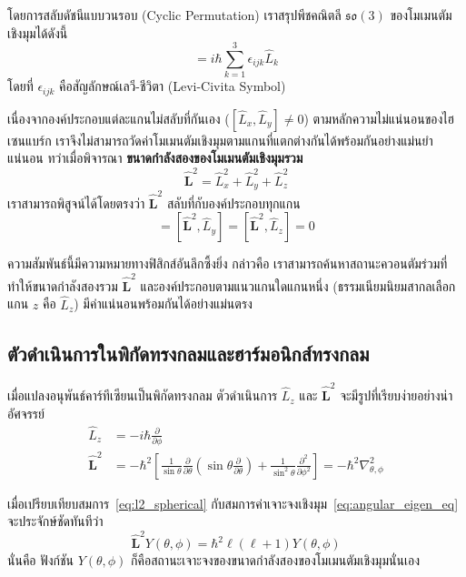 โดยการสลับดัชนีแบบวนรอบ (Cyclic Permutation) เราสรุปพีชคณิตลี $\mathfrak{so}(3)$ ของโมเมนตัมเชิงมุมได้ดังนี้
\begin{equation}
[\hat{L}_i, \hat{L}_j] = i\hbar \sum_{k=1}^3 \epsilon_{ijk} \hat{L}_k
\label{eq:angmom_lie_algebra}
\end{equation}
โดยที่ $\epsilon_{ijk}$ คือสัญลักษณ์เลวี-ชีวิตา (Levi-Civita Symbol)

เนื่องจากองค์ประกอบแต่ละแกนไม่สลับที่กันเอง ($[\hat{L}_x, \hat{L}_y] \neq 0$) ตามหลักความไม่แน่นอนของไฮเซนแบร์ก เราจึงไม่สามารถวัดค่าโมเมนตัมเชิงมุมตามแกนที่แตกต่างกันได้พร้อมกันอย่างแม่นยำแน่นอน ทว่าเมื่อพิจารณา \textbf{ขนาดกำลังสองของโมเมนตัมเชิงมุมรวม}
\begin{equation}
\hat{\mathbf{L}}^2 = \hat{L}_x^2 + \hat{L}_y^2 + \hat{L}_z^2
\end{equation}
เราสามารถพิสูจน์ได้โดยตรงว่า $\hat{\mathbf{L}}^2$ สลับที่กับองค์ประกอบทุกแกน
\begin{equation}
[\hat{\mathbf{L}}^2, \hat{L}_x] = [\hat{\mathbf{L}}^2, \hat{L}_y] = [\hat{\mathbf{L}}^2, \hat{L}_z] = 0
\label{eq:l2_commute_all}
\end{equation}

ความสัมพันธ์นี้มีความหมายทางฟิสิกส์อันลึกซึ้งยิ่ง กล่าวคือ เราสามารถค้นหาสถานะควอนตัมร่วมที่ทำให้ขนาดกำลังสองรวม $\hat{\mathbf{L}}^2$ และองค์ประกอบตามแนวแกนใดแกนหนึ่ง (ธรรมเนียมนิยมสากลเลือกแกน $z$ คือ $\hat{L}_z$) มีค่าแน่นอนพร้อมกันได้อย่างแม่นตรง

\subsection{ตัวดำเนินการในพิกัดทรงกลมและฮาร์มอนิกส์ทรงกลม}
เมื่อแปลงอนุพันธ์คาร์ทีเซียนเป็นพิกัดทรงกลม ตัวดำเนินการ $\hat{L}_z$ และ $\hat{\mathbf{L}}^2$ จะมีรูปที่เรียบง่ายอย่างน่าอัศจรรย์
\begin{align}
\hat{L}_z &= -i\hbar \frac{\partial}{\partial \phi} \label{eq:lz_spherical} \\
\hat{\mathbf{L}}^2 &= -\hbar^2 \left[ \frac{1}{\sin\theta} \frac{\partial}{\partial \theta}\left( \sin\theta \frac{\partial}{\partial \theta} \right) + \frac{1}{\sin^2\theta} \frac{\partial^2}{\partial \phi^2} \right] = -\hbar^2 \nabla_{\theta, \phi}^2 \label{eq:l2_spherical}
\end{align}

เมื่อเปรียบเทียบสมการ~\eqref{eq:l2_spherical} กับสมการค่าเจาะจงเชิงมุม~\eqref{eq:angular_eigen_eq} จะประจักษ์ชัดทันทีว่า
\begin{equation}
\hat{\mathbf{L}}^2 Y(\theta, \phi) = \hbar^2 \ell(\ell + 1) Y(\theta, \phi)
\end{equation}
นั่นคือ ฟังก์ชัน $Y(\theta, \phi)$ ก็คือสถานะเจาะจงของขนาดกำลังสองของโมเมนตัมเชิงมุมนั่นเอง

